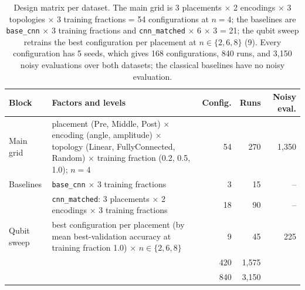 \begin{table}[!t]
\caption{Design matrix per dataset. The main grid is 3 placements $\times$ 2 encodings $\times$ 3 topologies $\times$ 3 training fractions = 54 configurations at $n = 4$; the baselines are \texttt{base\_cnn} $\times$ 3 training fractions and \texttt{cnn\_matched} $\times$ 6 $\times$ 3 = 21; the qubit sweep retrains the best configuration per placement at $n \in \{2, 6, 8\}$ (9). Every configuration has 5 seeds, which gives 168 configurations, 840 runs, and 3,150 noisy evaluations over both datasets; the classical baselines have no noisy evaluation.}
\label{tab:design}
\centering
\footnotesize
\setlength{\tabcolsep}{3pt}
\begin{tabular}{@{}>{\raggedright\arraybackslash}p{1.4cm}>{\raggedright\arraybackslash}p{3.5cm}rrr@{}}
\toprule
Block & Factors and levels & Config. & Runs & Noisy eval. \\
\midrule
Main grid & placement (Pre, Middle, Post) $\times$ encoding (angle, amplitude) $\times$ topology (Linear, FullyConnected, Random) $\times$ training fraction (0.2, 0.5, 1.0); $n = 4$ & 54 & 270 & 1,350 \\
\addlinespace
Baselines & \texttt{base\_cnn} $\times$ 3 training fractions & 3 & 15 & -- \\
 & \texttt{cnn\_matched}: 3 placements $\times$ 2 encodings $\times$ 3 training fractions & 18 & 90 & -- \\
\addlinespace
Qubit sweep & best configuration per placement (by mean best-validation accuracy at training fraction 1.0) $\times$ $n \in \{2, 6, 8\}$ & 9 & 45 & 225 \\
\midrule
\multicolumn{2}{@{}l}{Per dataset} & 84 & 420 & 1,575 \\
\multicolumn{2}{@{}l}{Both datasets} & 168 & 840 & 3,150 \\
\bottomrule
\end{tabular}
\end{table}
